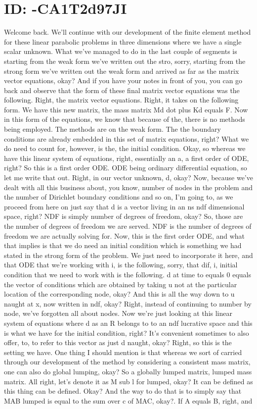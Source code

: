 \documentclass[10pt]{article}
\begin{document}
\section*{ID: -CA1T2d97JI}
Welcome back. We'll continue with our development of the finite element method for these linear parabolic problems in three dimensions where we have a single scalar unknown. What we've managed to do in the last couple of segments is starting from the weak form we've written out the stro, sorry, starting from the strong form we've written out the weak form and arrived as far as the matrix vector equations, okay? And if you have your notes in front of you, you can go back and observe that the form of these final matrix vector equations was the following. Right, the matrix vector equations. Right, it takes on the following form. We have this new matrix, the mass matrix Md dot plus Kd equals F. Now in this form of the equations, we know that because of the, there is no methods being employed. The methods are on the weak form. The the boundary conditions are already embedded in this set of matrix equations, right? What we do need to count for, however, is the, the initial condition. Okay, so whereas we have this linear system of equations, right, essentially an a, a first order of ODE, right? So this is a first order ODE. ODE being ordinary differential equation, so let me write that out. Right, in our vector unknown, d, okay? Now, because we've dealt with all this business about, you know, number of nodes in the problem and the number of Dirichlet boundary conditions and so on, I'm going to, as we proceed from here on just say that d is a vector living in an ns ndf dimensional space, right? NDF is simply number of degrees of freedom, okay? So, those are the number of degrees of freedom we are served. NDF is the number of degrees of freedom we are actually solving for. Now, this is the first order ODE, and what that implies is that we do need an initial condition which is something we had stated in the strong form of the problem. We just need to incorporate it here, and that ODE that we're working with i, is the following, sorry, that dif, i, initial condition that we need to work with is the following. d at time to equals 0 equals the vector of conditions which are obtained by taking u not at the particular location of the corresponding node, okay? And this is all the way down to u naught at x, now written in ndf, okay? Right, instead of continuing to number by node, we've forgotten all about nodes. Now we're just looking at this linear system of equations where d as an R belongs to to an ndf lucrative space and this is what we have for the initial condition, right? It's convenient sometimes to also offer, to, to refer to this vector as just d naught, okay? Right, so this is the setting we have. One thing I should mention is that whereas we sort of carried through our development of the method by considering a consistent mass matrix, one can also do global lumping, okay? So a globally lumped matrix, lumped mass matrix. All right, let's denote it as M sub l for lumped, okay? It can be defined as this thing can be defined. Okay? And the way to do that is to simply say that MAB lumped is equal to the sum over c of MAC, okay?. If A equals B, right, and 
\end{document}

